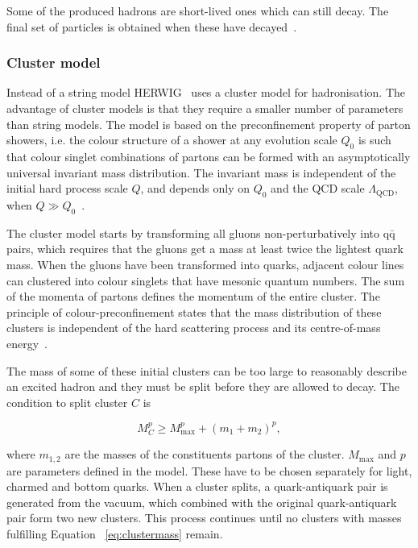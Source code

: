 Some of the produced hadrons are short-lived ones which can still decay. The final set of particles is obtained when these have decayed~\cite{introPythia82}.


\subsubsection*{Cluster model}
Instead of a string model HERWIG~\cite{herwigManual} uses a cluster model for hadronisation. The advantage of cluster models is that they require a smaller number of parameters than string models. The model is based on the preconfinement property of parton showers, i.e. the colour structure of a shower at any evolution scale $Q_0$ is such that colour singlet combinations of partons can be formed with an asymptotically universal invariant mass distribution. The invariant mass is independent of the initial hard process scale $Q$, and depends only on $Q_0$ and the QCD scale $\Lambda _ \mathrm{QCD}$, when $Q \gg Q_0$~\cite{eventGenerators}.

The cluster model starts by transforming all gluons non-perturbatively into $\mathrm{q \bar q}$ pairs, which requires that the gluons get a mass at least twice the lightest quark mass. When the gluons have been transformed into quarks, adjacent colour lines can clustered into colour singlets that have mesonic quantum numbers. The sum of the momenta of partons defines the momentum of the entire cluster. The principle of colour-preconfinement states that the mass distribution of these clusters is independent of the hard scattering process and its centre-of-mass energy~\cite{herwigManual}. %

The mass of some of these initial clusters can be too large to reasonably describe an excited hadron and they must be split before they are allowed to decay. The condition to split cluster $C$ is~\cite{herwigManual}

\begin{equation}
M_C^p \geq M_\mathrm{max}^p  + \left( m_1 + m_2\right)^p,
\label{eq:clustermass}
\end{equation}

\noindent where $m_{1,2}$ are the masses of the constituents partons of the cluster. $M_\mathrm{max}$ and $p$ are parameters defined in the model. These have to be chosen separately for light, charmed and bottom quarks. When a cluster splits, a quark-antiquark pair is generated from the vacuum, which combined with the original quark-antiquark pair form two new clusters. This process continues until no clusters with masses fulfilling Equation ~\ref{eq:clustermass} remain.

